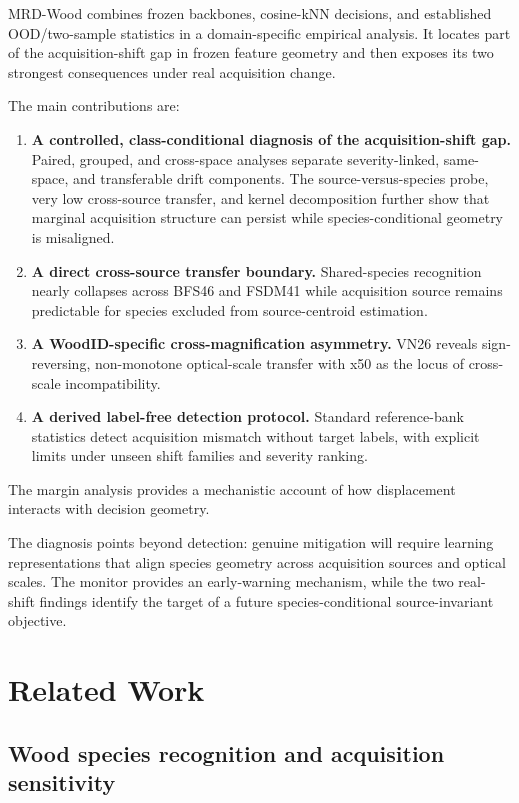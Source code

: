 \documentclass[a4paper,fleqn]{els-cas-templates/cas-sc}
\begin{document}
MRD-Wood combines frozen backbones, cosine-kNN decisions, and established
OOD/two-sample statistics in a domain-specific empirical analysis. It
locates part of the acquisition-shift gap in frozen feature geometry and then exposes
its two strongest consequences under real acquisition change.

The main contributions are:

\begin{enumerate}
  \item \textbf{A controlled, class-conditional diagnosis of the acquisition-shift
  gap.} Paired, grouped, and cross-space analyses separate severity-linked,
  same-space, and transferable drift components. The source-versus-species
  probe, very low cross-source transfer, and kernel decomposition further
  show that marginal acquisition structure can persist while
  species-conditional geometry is misaligned.
  \item \textbf{A direct cross-source transfer boundary.} Shared-species
  recognition nearly collapses across BFS46 and FSDM41 while acquisition source
  remains predictable for species excluded from source-centroid estimation.
  \item \textbf{A WoodID-specific cross-magnification asymmetry.} VN26 reveals
  sign-reversing, non-monotone optical-scale transfer with x50 as the locus of
  cross-scale incompatibility.
  \item \textbf{A derived label-free detection protocol.} Standard
  reference-bank statistics detect acquisition mismatch without target labels,
  with explicit limits under unseen shift families and severity ranking.
\end{enumerate}

The margin analysis provides a mechanistic account of how displacement
interacts with decision geometry.

The diagnosis points beyond detection: genuine mitigation will require learning
representations that align species geometry across acquisition sources and
optical scales. The monitor provides an early-warning mechanism, while the two
real-shift findings identify the target of a future species-conditional
source-invariant objective.
\section{Related Work}
\label{sec:related}

\subsection{Wood species recognition and acquisition sensitivity}
\end{document}
